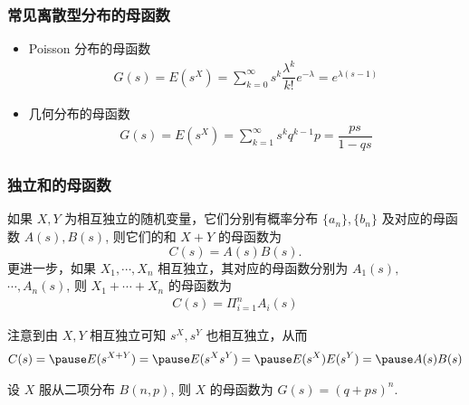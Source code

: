 \begin{frame}
	\frametitle{常见离散型分布的母函数}
	\begin{itemize}[<+-|alert@+>]
		\item Poisson 分布的母函数
		\begin{eqnarray*}
			G(s)=E(s^X)=\sum_{k=0}^\infty s^k\dfrac{\lambda^k}{k!}e^{-\lambda}=e^{\lambda(s-1)}
		\end{eqnarray*}
		\item 几何分布的母函数
		\begin{eqnarray*}
			G(s)=E(s^X)=\sum_{k=1}^\infty s^kq^{k-1}p=\dfrac{ps}{1-qs}
		\end{eqnarray*}

	\end{itemize}

\end{frame}

\begin{frame}
	\frametitle{独立和的母函数}
	\begin{thm}
		如果 $X,Y$ 为相互独立的随机变量，它们分别有概率分布 $\{a_n\}, \{b_n\}$ 及对应的母函数 $A (s), B (s)$, 则它们的和 $X+Y$ 的母函数为
		\[C(s)=A(s)B(s).\]
		\pause 更进一步，如果 $X_1,\cdots, X_n$ 相互独立，其对应的母函数分别为 $A_1 (s),$ $ \cdots, A_n (s)$, 则 $X_1+\cdots+X_n$ 的母函数为 \pause
		\begin{eqnarray*}
			C(s)=\Pi_{i=1}^nA_i(s)
		\end{eqnarray*}

	\end{thm}
	\pause   \zheng 注意到由 $X,Y$ 相互独立可知 $s^X, s^Y$ 也相互独立，从而 \pause
	\begin{eqnarray*}
		C(s)=\pause E(s^{X+Y})=\pause E(s^X s^Y)=\pause E(s^X)E(s^Y)=\pause A(s)B(s)
	\end{eqnarray*}

	\pause
	\begin{exam}
		设 $X$ 服从二项分布 $B (n,p)$, 则 $X$ 的母函数为 $G (s)=(q+ps)^n$.
	\end{exam}

\end{frame}

